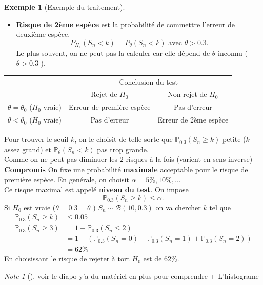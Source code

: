 \documentclass{article}
\theoremstyle{plain}%
\theoremstyle{definition}
\newtheorem{exmp}{Exemple}[section]
\theoremstyle{remark}
\newtheorem*{note}{Note}
\begin{document}
\begin{exmp}[Exemple du traitement]
\begin{itemize}
        \item \textbf{Risque de 2ème espèce} est la probabilité de commettre l'erreur de deuxième espèce. 
        \[
            P_{H_1} (S_n < k) = P_\theta (S_n < k) \text{ avec } \theta > 0.3
        .\]
        Le plus souvent, on ne peut pas la calculer car elle dépend de $ \theta $ inconnu ($ \theta > 0.3 $ ).
    \end{itemize}
    \begin{table}[!htbp]
        \begin{tabular}{|c|c|c|}
        \hline
        \multirow{2}{*}{}                    & \multicolumn{2}{c|}{Conclusion du test}           \\ \cline{2-3} 
                                            & Rejet de $ H_0 $          & Non-rejet de $ H_0 $  \\ \hline
        $ \theta = \theta _0 $ ($H_0$ vraie) & Erreur de première espèce & Pas d'erreur          \\ \hline
        $ \theta < \theta _0 $ ($H_0$ vraie) & Pas d'erreur              & Erreur de 2ème espèce \\ \hline
        \end{tabular}
    \end{table}
    Pour trouver le seuil $ k $, on le choisit de telle sorte que $ \mathbb{P}_{0.3} (S_n \geq k) $ petite ($ k $ assez grand) et $ \mathbb{P}_\theta (S_n < k) $ pas trop grande. \\
    Comme on ne peut pas diminuer les 2 risques à la fois (varient en sens inverse)\\
    \textbf{Compromis} On fixe une probabilité \textbf{maximale} acceptable pour le risque de première espèce. En genérale, on choisit $ \alpha = 5\%, 10\%, \dots $ \\
    Ce risque maximal est appelé \textbf{niveau du test}. On impose 
    \[
        \mathbb{P}_{0.3} (S_n \geq k) \leq \alpha 
    .\]
    Si $ H_0 $ est vraie ($ \theta = 0.3 = \theta  $ ) $ S_n \sim \mathcal{B}(10,0.3) $ on va chercher $ k $ tel que  \begin{align*}
        \mathbb{P}_{0.3} (S_n \geq k) &\leq 0.05 \\
        \mathbb{P}_{0.3} (S_n \geq 3) &= 1-\mathbb{P}_{0.3}(S_n \leq 2) \\
        &= 1-(\mathbb{P}_{0.3}(S_n=0) + \mathbb{P}_{0.3}(S_n =1) + \mathbb{P}_{0.3}(S_n = 2)) \\
        &= 62 \%        
    \end{align*}
    En choisissant le risque de rejeter à tort $ H_0 $ est de 62\%.
    \begin{note}[]
        voir le diapo y'a du matériel en plus pour comprendre + L'histograme  
    \end{note}


\end{exmp}
\end{document}
